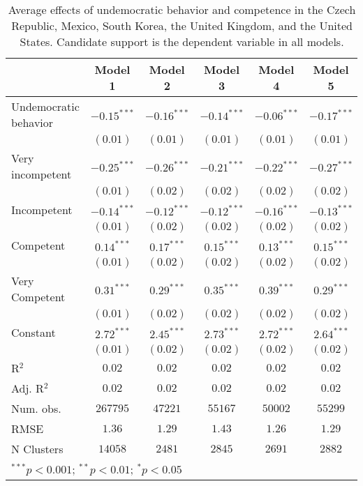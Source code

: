 
\begin{table}[!htbp]
\caption{Average effects of undemocratic behavior and competence in the Czech Republic, Mexico, South Korea, the United Kingdom, and the United States. Candidate support is the dependent variable in all models.}
\begin{center}
\begin{tabular}{l c c c c c}
\hline
 & Model 1 & Model 2 & Model 3 & Model 4 & Model 5 \\
\hline
Undemocratic behavior & $-0.15^{***}$ & $-0.16^{***}$ & $-0.14^{***}$ & $-0.06^{***}$ & $-0.17^{***}$ \\
                      & $(0.01)$      & $(0.01)$      & $(0.01)$      & $(0.01)$      & $(0.01)$      \\
Very incompetent      & $-0.25^{***}$ & $-0.26^{***}$ & $-0.21^{***}$ & $-0.22^{***}$ & $-0.27^{***}$ \\
                      & $(0.01)$      & $(0.02)$      & $(0.02)$      & $(0.02)$      & $(0.02)$      \\
Incompetent           & $-0.14^{***}$ & $-0.12^{***}$ & $-0.12^{***}$ & $-0.16^{***}$ & $-0.13^{***}$ \\
                      & $(0.01)$      & $(0.02)$      & $(0.02)$      & $(0.02)$      & $(0.02)$      \\
Competent             & $0.14^{***}$  & $0.17^{***}$  & $0.15^{***}$  & $0.13^{***}$  & $0.15^{***}$  \\
                      & $(0.01)$      & $(0.02)$      & $(0.02)$      & $(0.02)$      & $(0.02)$      \\
Very Competent        & $0.31^{***}$  & $0.29^{***}$  & $0.35^{***}$  & $0.39^{***}$  & $0.29^{***}$  \\
                      & $(0.01)$      & $(0.02)$      & $(0.02)$      & $(0.02)$      & $(0.02)$      \\
Constant              & $2.72^{***}$  & $2.45^{***}$  & $2.73^{***}$  & $2.72^{***}$  & $2.64^{***}$  \\
                      & $(0.01)$      & $(0.02)$      & $(0.02)$      & $(0.02)$      & $(0.02)$      \\
\hline
R$^2$                 & $0.02$        & $0.02$        & $0.02$        & $0.02$        & $0.02$        \\
Adj. R$^2$            & $0.02$        & $0.02$        & $0.02$        & $0.02$        & $0.02$        \\
Num. obs.             & $267795$      & $47221$       & $55167$       & $50002$       & $55299$       \\
RMSE                  & $1.36$        & $1.29$        & $1.43$        & $1.26$        & $1.29$        \\
N Clusters            & $14058$       & $2481$        & $2845$        & $2691$        & $2882$        \\
\hline
\multicolumn{6}{l}{\scriptsize{$^{***}p<0.001$; $^{**}p<0.01$; $^{*}p<0.05$}}
\end{tabular}
\label{table_a1}
\end{center}
\end{table}
